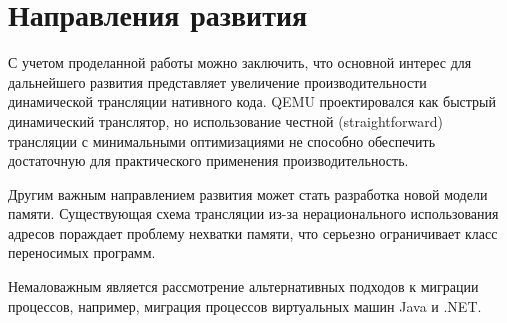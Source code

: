 \section{Направления развития}

С учетом проделанной работы можно заключить, что основной интерес для дальнейшего развития представляет увеличение производительности динамической трансляции нативного кода. QEMU проектировался как быстрый динамический транслятор, но использование честной (straightforward) трансляции с минимальными оптимизациями не способно обеспечить достаточную для практического применения производительность.

Другим важным направлением развития может стать разработка новой модели памяти. Существующая схема трансляции из-за нерационального использования адресов пораждает проблему нехватки памяти, что серьезно ограничивает класс переносимых программ.

Немаловажным является рассмотрение альтернативных подходов к миграции процессов, например, миграция процессов виртуальных машин Java и .NET.
